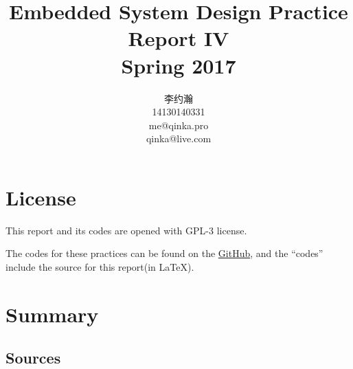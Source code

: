 \documentclass{report}
\title{Embedded System Design Practice Report IV \\ Spring 2017}
\author{李约瀚 \\ 14130140331 \\ me@qinka.pro \\ qinka@live.com}
\begin{document}
    \maketitle
    \tableofcontents
    
    \chapter{License}
    \label{chap:license}
    This report and its codes are opened with GPL-3 license.
    
    The codes for these practices can be found on the%
    \href{https://github.com/Qinka/embedded-system-design-homework}{GitHub},
    and the ``codes'' include the source for this report(in \LaTeX).
    
    \chapter{Summary}
    \label{chap:summary}
    
    
    \begin{appendix}
        \chapter{Sources}
        \label{achap:source}
    \end{appendix}
    
\end{document}
